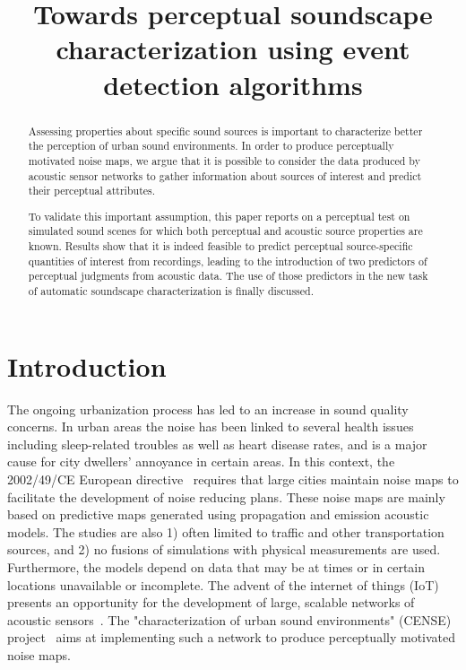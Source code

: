 \documentclass{article}
\title{Towards perceptual soundscape characterization using event detection algorithms}
\begin{document}
\ninept
\maketitle

\begin{sloppy}

\begin{abstract}
Assessing properties about specific sound sources is important to  characterize better the perception of urban sound environments. In order to produce perceptually motivated noise maps, we argue that it is possible to consider the data produced by acoustic sensor networks to gather information about sources of interest and predict their perceptual attributes.

To validate this important assumption, this paper reports on a perceptual test on simulated sound scenes for which both perceptual and acoustic source properties are known. Results show that it is indeed feasible to predict perceptual source-specific quantities of interest from recordings, leading to the introduction of two predictors of perceptual judgments from acoustic data. The use of those predictors in the new task of automatic soundscape characterization is finally discussed.

\end{abstract}

\begin{keywords}
\end{keywords}

\section{Introduction}
\label{sec:intro}

The ongoing urbanization process has led to an increase in sound quality concerns. In urban areas the noise has been linked to several health issues including sleep-related troubles as well as heart disease rates, and is a major cause for city dwellers' annoyance in certain areas. In this context, the 2002/49/CE European directive~\cite{ec2002} requires that large cities maintain noise maps to facilitate the development of noise reducing plans. These noise maps are mainly based on predictive maps generated using propagation and emission acoustic models. The studies are also 1) often limited to traffic and other transportation sources, and 2) no fusions of simulations with physical measurements are used. Furthermore, the models depend on data that may be at times or in certain locations unavailable or incomplete. The advent of the internet of things (IoT) presents an opportunity for the development of large, scalable networks of acoustic sensors~\cite{mydlarz2017, gontier2017}. The "characterization of urban sound environments" (CENSE) project~\cite{picault2017} aims at implementing such a network to produce perceptually motivated noise maps.



\end{sloppy}
\end{document}
